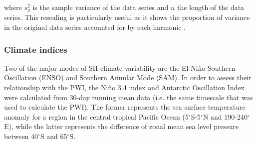 where $s_y^2$ is the sample variance of the data series and $n$ the length of the data series. This rescaling is particularly useful as it shows the proportion of variance in the original data series accounted for by each harmonic \citep{Wilks2011}.

\subsubsection{Climate indices}
Two of the major modes of SH climate variability are the El Ni\~{n}o Southern Oscillation (ENSO) and Southern Annular Mode (SAM). In order to assess their relationship with the PWI, the Ni\~{n}o 3.4 index \citep{Trenberth2001} and Antarctic Oscillation Index \citep[AOI;][]{Gong1999} were calculated from 30-day running mean data (i.e. the same timescale that was used to calculate the PWI). The former represents the sea surface temperature anomaly for a region in the central tropical Pacific Ocean (5$^{\circ}$S-5$^{\circ}$N and 190-240$^{\circ}$E), while the latter represents the difference of zonal mean sea level pressure between 40$^{\circ}$S and 65$^{\circ}$S. 

